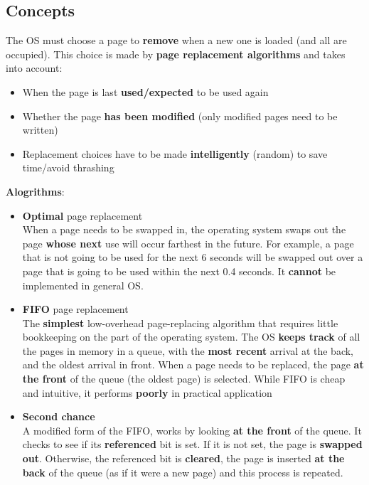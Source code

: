 \documentclass{article}
\begin{document}
\subsection{Concepts}
\begin{flushleft}
The OS must choose a page to \textbf{remove} when a new one is loaded (and all are occupied). This choice is made by \textbf{page replacement algorithms} and takes into account:
\begin{itemize}
	\item When the page is last \textbf{used/expected} to be used again
	\item Whether the page \textbf{has been modified} (only modified pages need to be written)
	\item Replacement choices have to be made \textbf{intelligently} (random) to save time/avoid thrashing
\end{itemize}
\textbf{Alogrithms}:
\begin{itemize}
	\item \textbf{Optimal} page replacement \\
	When a page needs to be swapped in, the operating system swaps out the page \textbf{whose next} use will occur farthest in the future. For example, a page that is not going to be used for the next 6 seconds will be swapped out over a page that is going to be used within the next 0.4 seconds. It \textbf{cannot} be implemented in general OS.

	\item \textbf{FIFO} page replacement\\
	The \textbf{simplest} low-overhead page-replacing algorithm that requires little bookkeeping on the part of the operating system. The OS \textbf{keeps track} of all the pages in memory in a queue, with the \textbf{most recent} arrival at the back, and the oldest arrival in front. When a page needs to be replaced, the page \textbf{at the front} of the queue (the oldest page) is selected. While FIFO is cheap and intuitive, it performs \textbf{poorly} in practical application

	\item \textbf{Second chance}\\
	A modified form of the FIFO, works by looking \textbf{at the front} of the queue. It checks to see if its \textbf{referenced} bit is set. If it is not set, the page is \textbf{swapped out}. Otherwise, the referenced bit is \textbf{cleared}, the page is inserted \textbf{at the back} of the queue (as if it were a new page) and this process is repeated.
	

\end{itemize}
\end{flushleft}
\end{document}
